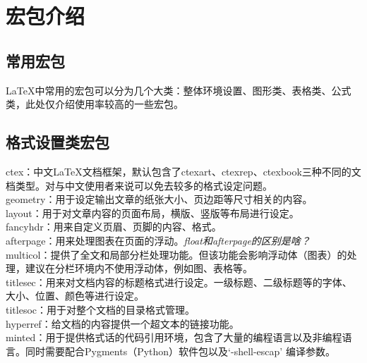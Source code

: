 \documentclass[12pt]{book}
\begin{document}
%
%

\chapter{宏包介绍}

\section{常用宏包}

\LaTeX{}中常用的宏包可以分为几个大类：整体环境设置、图形类、表格类、公式类，此处仅介绍使用率较高的一些宏包。



\section{格式设置类宏包}


ctex：中文\LaTeX{}文档框架，默认包含了ctexart、ctexrep、ctexbook三种不同的文档类型。对与中文使用者来说可以免去较多的格式设定问题。\\
geometry：用于设定输出文章的纸张大小、页边距等尺寸相关的内容。\\
layout：用于对文章内容的页面布局，横版、竖版等布局进行设定。\\
fancyhdr：用来自定义页眉、页脚的内容、格式。\\
afterpage：用来处理图表在页面的浮动。\textit{float和afterpage的区别是啥？}\\
multicol：提供了全文和局部分栏处理功能。但该功能会影响浮动体（图表）的处理，建议在分栏环境内不使用浮动体，例如图、表格等。\\
titlesec：用来对文档内容的标题格式进行设定。一级标题、二级标题等的字体、大小、位置、颜色等进行设定。\\
titlesoc：用于对整个文档的目录格式管理。\\
hyperref：给文档的内容提供一个超文本的链接功能。\\
minted：用于提供格式话的代码引用环境，包含了大量的编程语言以及非编程语言。同时需要配合Pygments（Python）软件包以及`-shell-escap' 编译参数。
\end{document}
